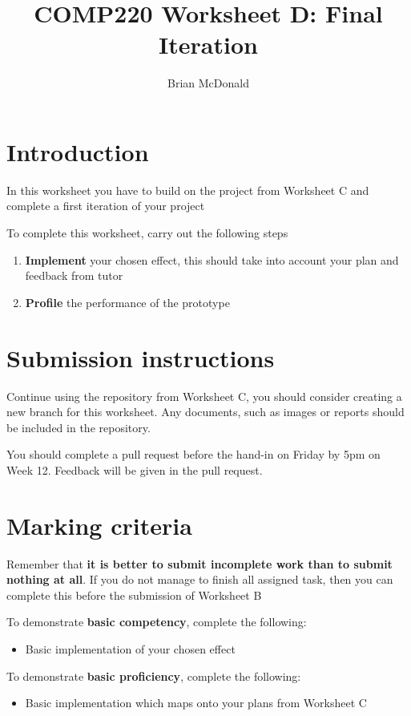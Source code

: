 \documentclass{../../../fal_assignment}
\title{COMP220 Worksheet D: Final Iteration}
\author{Brian McDonald}
\begin{document}
\maketitle

\section*{Introduction}

In this worksheet you have to build on the project from Worksheet C and complete a first iteration of your project

To complete this worksheet, carry out the following steps
\begin{enumerate}[label=(\alph*)]
	\item \textbf{Implement} your chosen effect, this should take into account your plan and feedback from tutor
	\item \textbf{Profile} the performance of the prototype
\end{enumerate}

\section*{Submission instructions}

Continue using the repository from Worksheet C, you should consider creating a new branch for this worksheet. Any documents, such as images or reports should be included in the repository.

You should complete a pull request before the hand-in on Friday by 5pm on Week 12. Feedback will be given in the pull request.

\section*{Marking criteria}

Remember that \textbf{it is better to submit incomplete work than to submit nothing at all}. If you do not manage to finish all assigned task, then you can complete this before the submission of Worksheet B

To demonstrate \textbf{basic competency}, complete the following:
\begin{itemize}
	\item Basic implementation of your chosen effect
\end{itemize} 

To demonstrate \textbf{basic proficiency}, complete the following:
\begin{itemize}
	\item Basic implementation which maps onto your plans from Worksheet C
\end{itemize}
\end{document}
